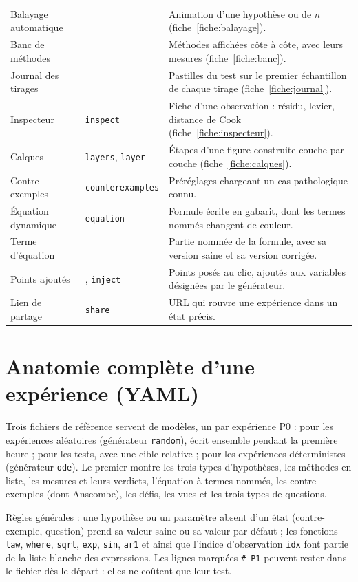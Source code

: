 \documentclass[11pt,a4paper]{article}
\begin{document}
\begin{appendices}
\begin{longtable}{@{}L{3.6cm} L{3.6cm} >{\raggedright\arraybackslash}p{\dimexpr\textwidth-7.2cm-4\tabcolsep\relax}@{}}
  Balayage automatique &  & Animation d'une hypothèse ou de $n$ (fiche~\ref{fiche:balayage}). \\
  Banc de méthodes &  & Méthodes affichées côte à côte, avec leurs mesures (fiche~\ref{fiche:banc}). \\
  Journal des tirages &  & Pastilles du test sur le premier échantillon de chaque tirage (fiche~\ref{fiche:journal}). \\
  Inspecteur & \texttt{inspect} & Fiche d'une observation : résidu, levier, distance de Cook (fiche~\ref{fiche:inspecteur}). \\
  Calques & \texttt{layers}, \texttt{layer} & Étapes d'une figure construite couche par couche (fiche~\ref{fiche:calques}). \\
  Contre-exemples & \texttt{counterexamples} & Préréglages chargeant un cas pathologique connu. \\
  Équation dynamique & \texttt{equation} & Formule écrite en gabarit, dont les termes nommés changent de couleur. \\
  Terme d'équation &  & Partie nommée de la formule, avec sa version saine et sa version corrigée. \\
  Points ajoutés & , \texttt{inject} & Points posés au clic, ajoutés aux variables désignées par le générateur. \\
  Lien de partage & \texttt{share} & URL qui rouvre une expérience dans un état précis. \\
\end{longtable}

\newpage
\section{Anatomie complète d'une expérience (YAML)}\label{ann:yaml}
Trois fichiers de référence servent de modèles, un par expérience P0 :  pour les expériences aléatoires (générateur \texttt{random}), écrit ensemble pendant la première heure ;  pour les tests, avec une cible relative ;  pour les expériences déterministes (générateur \texttt{ode}). Le premier montre les trois types d'hypothèses, les méthodes en liste, les mesures et leurs verdicts, l'équation à termes nommés, les contre-exemples (dont Anscombe), les défis, les vues et les trois types de questions.

Règles générales : une hypothèse ou un paramètre absent d'un état (contre-exemple, question) prend sa valeur saine ou sa valeur par défaut ; les fonctions \texttt{law}, \texttt{where}, \texttt{sqrt}, \texttt{exp}, \texttt{sin}, \texttt{ar1} et  ainsi que l'indice d'observation \texttt{idx} font partie de la liste blanche des expressions. Les lignes marquées \texttt{\# P1} peuvent rester dans le fichier dès le départ : elles ne coûtent que leur test.


\end{appendices}
\end{document}
